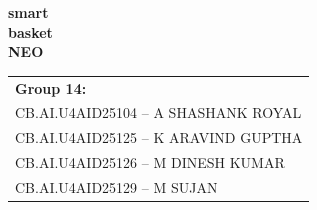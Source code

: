 \documentclass[10pt]{beamer}
\begin{document}
\begin{frame}
    \vspace*{0.8cm}
    \begin{center}
        \begin{tcolorbox}[colback=black,colframe=black,arc=6mm,width=0.52\textwidth,halign=center,valign=center,boxrule=0pt,top=8mm,bottom=8mm]
            {\fontsize{36}{42}\selectfont \textbf{\color{lime!85!black} smart}}\\[0.1cm]
            {\fontsize{36}{42}\selectfont \textbf{\color{lime!85!black} basket}}\\[0.25cm]
            {\fontsize{18}{22}\selectfont \textbf{\color{lime!85!black} NEO}}
        \end{tcolorbox}
    \end{center}
    
    \vfill
    
    \hfill
    \begin{tabular}{l}
        \textbf{\fontsize{8.5}{11}\selectfont \color{black} Group 14:}\\[0.08cm]
        \fontsize{7.5}{10}\selectfont CB.AI.U4AID25104 -- A SHASHANK ROYAL\\[0.05cm]
        \fontsize{7.5}{10}\selectfont CB.AI.U4AID25125 -- K ARAVIND GUPTHA\\[0.05cm]
        \fontsize{7.5}{10}\selectfont CB.AI.U4AID25126 -- M DINESH KUMAR\\[0.05cm]
        \fontsize{7.5}{10}\selectfont CB.AI.U4AID25129 -- M SUJAN
    \end{tabular}
    \hspace*{0.6cm}
    \vspace*{0.4cm}
\end{frame}
\end{document}
